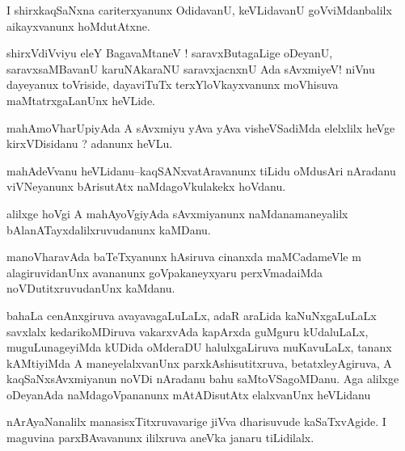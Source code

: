 \documentclass{article}
\begin{document}
\begin{mn}%
I shirxkaqSaNxna cariterxyanunx OdidavanU, keVLidavanU goVviMdanbalilx aikayxvanunx 
hoMdutAtxne.
\end{mn}


\begin{mn}%
shirxVdiVviyu eleY BagavaMtaneV ! saravxButagaLige oDeyanU, saravxsaMBavanU karuNAkaraNU 
saravxjacnxnU Ada sAvxmiyeV! niVnu dayeyanux  toVriside, dayaviTuTx terxYloVkayxvanunx 
moVhisuva maMtatrxgaLanUnx heVLide.
\end{mn}

\begin{mn}%
mahAmoVharUpiyAda A sAvxmiyu yAva yAva visheVSadiMda elelxlilx heVge kirxVDisidanu ? 
adanunx heVLu.
\end{mn}

\begin{mn}%
mahAdeVvanu heVLidanu--kaqSANxvatAravanunx tiLidu oMdusAri nAradanu viVNeyanunx bArisutAtx
naMdagoVkulakekx hoVdanu.
\end{mn}

\begin{mn}%
alilxge hoVgi A mahAyoVgiyAda sAvxmiyanunx naMdanamaneyalilx bAlanATayxdalilxruvudanunx 
kaMDanu.
\end{mn}

\begin{mn}%
manoVharavAda baTeTxyanunx hAsiruva cinanxda maMCadameVle m alagiruvidanUnx avananunx 
goVpakaneyxyaru perxVmadaiMda noVDutitxruvudanUnx kaMdanu.
\end{mn}

\begin{mn}%
bahaLa cenAnxgiruva avayavagaLuLaLx, adaR araLida kaNuNxgaLuLaLx savxlalx kedarikoMDiruva 
vakarxvAda kapArxda guMguru kUdaluLaLx, muguLunageyiMda kUDida oMderaDU halulxgaLiruva 
muKavuLaLx, tananx kAMtiyiMda A maneyelalxvanUnx parxkAshisutitxruva, betatxleyAgiruva, A 
kaqSaNxsAvxmiyanun noVDi nAradanu bahu saMtoVSagoMDanu. Aga alilxge oDeyanAda 
naMdagoVpananunx mAtADisutAtx elalxvanUnx heVLidanu
\end{mn}

\begin{mn}%
nArAyaNanalilx manasisxTitxruvavarige jiVva dharisuvude kaSaTxvAgide. I maguvina 
parxBAvavanunx ililxruva aneVka janaru tiLidilalx.
\end{mn}
\end{document}
